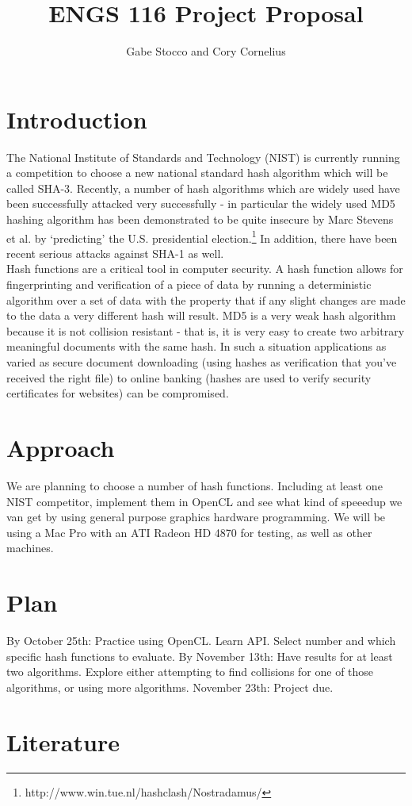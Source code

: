 \documentclass{article}
\title{ENGS 116 Project Proposal}
\author{Gabe Stocco and Cory Cornelius}
\begin{document}
\maketitle
\section{Introduction}
The National Institute of Standards and Technology (NIST) is currently running a competition to choose a new national standard hash algorithm which will be called SHA-3.  Recently, a number of hash algorithms which are widely used have been successfully attacked very successfully - in particular the widely used MD5 hashing algorithm has been demonstrated to be quite insecure by Marc Stevens et al. by `predicting' the U.S. presidential election.\footnote{http://www.win.tue.nl/hashclash/Nostradamus/}  In addition, there have been recent serious attacks against SHA-1 as well.\\
Hash functions are a critical tool in computer security.  A hash function allows for fingerprinting and verification of a piece of data by running a deterministic algorithm over a set of data with the property that if any slight changes are made to the data a very different hash will result.  MD5 is a very weak hash algorithm because it is not collision resistant - that is, it is very easy to create two arbitrary meaningful documents with the same hash.  In such a situation applications as varied as secure document downloading (using hashes as verification that you've received the right file) to online banking (hashes are used to verify security certificates for websites) can be compromised.\\
\section{Approach}
We are planning to choose a number of hash functions. Including at least one NIST competitor, implement them in OpenCL and see what kind of speeedup we van get by using general purpose graphics hardware programming.  We will be using a Mac Pro with an ATI Radeon HD 4870 for testing, as well as other machines.
\section{Plan}
By October 25th: Practice using OpenCL.  Learn API.  Select number and which specific hash functions to evaluate.
By November 13th: Have results for at least two algorithms. Explore either attempting to find collisions for one of those algorithms, or using more algorithms.
November 23th: Project due.
\section{Literature}
\end{document}
